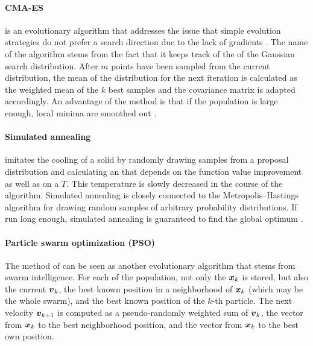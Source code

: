 \paragraph{CMA-ES}

\cite{Hansen03Reducing}
is an evolutionary algorithm that addresses the issue
that simple evolution strategies do not prefer a search direction
due to the lack of gradients \cite{Toussaint15Introduction}.
The name of the algorithm stems from the fact
that it keeps track of the  of the
Gaussian search distribution.
After $m$ points have been sampled from the current distribution,
the mean of the distribution for the next iteration
is calculated as the weighted mean of the $k$ best samples and
the covariance matrix is adapted accordingly.
An advantage of the method is that if the population is large enough,
local minima are smoothed out \cite{Toussaint15Introduction}.

\paragraph{Simulated annealing}

imitates the cooling of a solid by randomly drawing samples
from a proposal distribution and calculating an 
that depends on the function value improvement as well as
on a  $T$.
This temperature is slowly decreased in the course of the algorithm.
Simulated annealing is closely connected to the
Metropolis--Hastings algorithm for drawing random samples of arbitrary
probability distributions.
If run long enough,
simulated annealing is guaranteed to find the global
optimum \cite{Toussaint15Introduction}.

\paragraph{Particle swarm optimization (PSO)}

The method of 
can be seen as another evolutionary algorithm
that stems from swarm intelligence.
For each  of the population,
not only the  ${\boldsymbol{x}}_k$ is stored,
but also the current  ${\boldsymbol{v}}_k$,
the best known position in a neighborhood of ${\boldsymbol{x}}_k$
(which may be the whole swarm), and
the best known position of the $k$-th particle.
The next velocity ${\boldsymbol{v}}_{k+1}$ is computed as
a pseudo-randomly weighted sum of ${\boldsymbol{v}}_k$,
the vector from ${\boldsymbol{x}}_k$ to the best neighborhood position, and
the vector from ${\boldsymbol{x}}_k$ to the best own position.

